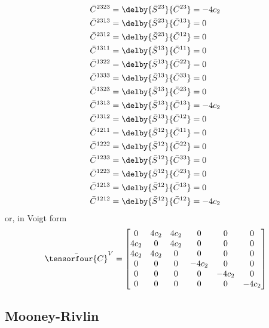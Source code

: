 \begin{equation}
\begin{split}
    \bar{C}^{2323}&=\delby{\bar{S}^{23}}{\bar{C}^{23}}=-4c_{2}\\
    \bar{C}^{2313}&=\delby{\bar{S}^{23}}{\bar{C}^{13}}=0\\
    \bar{C}^{2312}&=\delby{\bar{S}^{23}}{\bar{C}^{12}}=0\\
    \bar{C}^{1311}&=\delby{\bar{S}^{13}}{\bar{C}^{11}}=0\\
    \bar{C}^{1322}&=\delby{\bar{S}^{13}}{\bar{C}^{22}}=0\\
    \bar{C}^{1333}&=\delby{\bar{S}^{13}}{\bar{C}^{33}}=0\\
    \bar{C}^{1323}&=\delby{\bar{S}^{13}}{\bar{C}^{23}}=0\\
    \bar{C}^{1313}&=\delby{\bar{S}^{13}}{\bar{C}^{13}}=-4c_{2}\\
    \bar{C}^{1312}&=\delby{\bar{S}^{13}}{\bar{C}^{12}}=0\\
    \bar{C}^{1211}&=\delby{\bar{S}^{12}}{\bar{C}^{11}}=0\\
    \bar{C}^{1222}&=\delby{\bar{S}^{12}}{\bar{C}^{22}}=0\\
    \bar{C}^{1233}&=\delby{\bar{S}^{12}}{\bar{C}^{33}}=0\\
    \bar{C}^{1223}&=\delby{\bar{S}^{12}}{\bar{C}^{23}}=0\\
    \bar{C}^{1213}&=\delby{\bar{S}^{12}}{\bar{C}^{13}}=0\\
    \bar{C}^{1212}&=\delby{\bar{S}^{12}}{\bar{C}^{12}}=-4c_{2}\\
  \end{split}
\end{equation}
or, in Voigt form
\begin{equation}
  \bar{\tensorfour{C}}^{V}=\begin{bmatrix}
  0 & 4c_{2} & 4c_{2} & 0 & 0 & 0 \\
  4c_{2} & 0 & 4c_{2} & 0 & 0 & 0 \\
  4c_{2} & 4c_{2} & 0 & 0 & 0 & 0 \\
  0     & 0      & 0 & -4c_{2} & 0 & 0 \\
  0     & 0      & 0 & 0      & -4c_{2} & 0 \\
  0     & 0      & 0 & 0      & 0      & -4c_{2} 
  \end{bmatrix}
\end{equation}


  
\subsection{Mooney-Rivlin}

